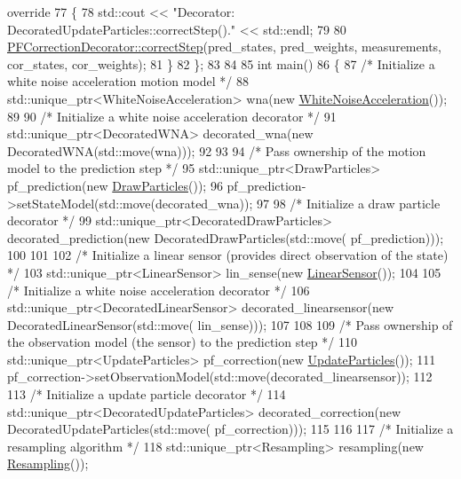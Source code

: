 \begin{DoxyCodeInclude}
{       override}
77 \textcolor{keyword}{    }\{
78         std::cout << \textcolor{stringliteral}{"Decorator: DecoratedUpdateParticles::correctStep()."} << std::endl;
79 
80         \mbox{\hyperlink{classbfl_1_1PFCorrectionDecorator_abb5ab0ef4245b67be546360a54416498}{PFCorrectionDecorator::correctStep}}(pred\_states, pred\_weights, 
      measurements, cor\_states, cor\_weights);
81     \}
82 \};
83 
84 
85 \textcolor{keywordtype}{int} main()
86 \{
87     \textcolor{comment}{/* Initialize a white noise acceleration motion model */}
88     std::unique\_ptr<WhiteNoiseAcceleration> wna(\textcolor{keyword}{new} \mbox{\hyperlink{classbfl_1_1WhiteNoiseAcceleration}{WhiteNoiseAcceleration}}());
89 
90     \textcolor{comment}{/* Initialize a white noise acceleration decorator */}
91     std::unique\_ptr<DecoratedWNA> decorated\_wna(\textcolor{keyword}{new} DecoratedWNA(std::move(wna)));
92 
93 
94     \textcolor{comment}{/* Pass ownership of the motion model to the prediction step */}
95     std::unique\_ptr<DrawParticles> pf\_prediction(\textcolor{keyword}{new} \mbox{\hyperlink{classbfl_1_1DrawParticles}{DrawParticles}}());
96     pf\_prediction->setStateModel(std::move(decorated\_wna));
97 
98     \textcolor{comment}{/* Initialize a draw particle decorator */}
99     std::unique\_ptr<DecoratedDrawParticles> decorated\_prediction(\textcolor{keyword}{new} DecoratedDrawParticles(std::move(
      pf\_prediction)));
100 
101 
102     \textcolor{comment}{/* Initialize a linear sensor (provides direct observation of the state) */}
103     std::unique\_ptr<LinearSensor> lin\_sense(\textcolor{keyword}{new} \mbox{\hyperlink{classbfl_1_1LinearSensor}{LinearSensor}}());
104 
105     \textcolor{comment}{/* Initialize a white noise acceleration decorator */}
106     std::unique\_ptr<DecoratedLinearSensor> decorated\_linearsensor(\textcolor{keyword}{new} DecoratedLinearSensor(std::move(
      lin\_sense)));
107 
108 
109     \textcolor{comment}{/* Pass ownership of the observation model (the sensor) to the prediction step */}
110     std::unique\_ptr<UpdateParticles> pf\_correction(\textcolor{keyword}{new} \mbox{\hyperlink{classbfl_1_1UpdateParticles}{UpdateParticles}}());
111     pf\_correction->setObservationModel(std::move(decorated\_linearsensor));
112 
113     \textcolor{comment}{/* Initialize a update particle decorator */}
114     std::unique\_ptr<DecoratedUpdateParticles> decorated\_correction(\textcolor{keyword}{new} DecoratedUpdateParticles(std::move(
      pf\_correction)));
115 
116 
117     \textcolor{comment}{/* Initialize a resampling algorithm */}
118     std::unique\_ptr<Resampling> resampling(\textcolor{keyword}{new} \mbox{\hyperlink{classbfl_1_1Resampling}{Resampling}}());

\end{DoxyCodeInclude}
